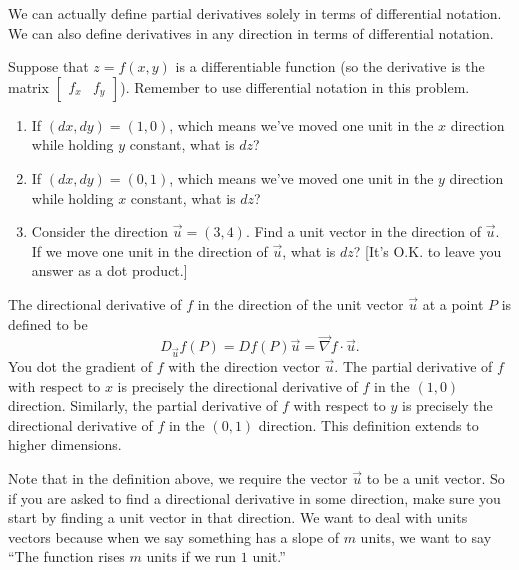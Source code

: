 We can actually define partial derivatives solely in terms of differential notation. We can also define derivatives in any direction in terms of differential notation.

\begin{problem}
Suppose that $z=f(x,y)$ is a differentiable function (so the derivative is the matrix $\begin{bmatrix}f_x&f_y\end{bmatrix}$).  Remember to use differential notation in this problem.
\begin{enumerate}
 \item If $(dx,dy)=(1,0)$, which means we've moved one unit in the $x$ direction while holding $y$ constant, what is $dz$?
 \item If $(dx,dy)=(0,1)$, which means we've moved one unit in the $y$ direction while holding $x$ constant, what is $dz$?
 \item Consider the direction $\vec u=(3,4)$.  Find a unit vector in the direction of $\vec u$.  If we move one unit in the direction of $\vec u$, what is $dz$? [It's O.K. to leave you answer as a dot product.]    
\end{enumerate}
 
\end{problem}

\begin{definition}
The directional derivative of $f$ in the direction of the unit vector $\vec u$ at a point $P$ is defined to be
$$D_{\vec u} f(P) = Df(P) \vec u = \vec \nabla f \cdot \vec u.$$
You dot the gradient of $f$ with the direction vector $\vec u$.
The partial derivative of $f$ with respect to $x$ is precisely the directional derivative of $f$ in the $(1,0)$ direction.  Similarly,  
the partial derivative of $f$ with respect to $y$ is precisely the directional derivative of $f$ in the $(0,1)$ direction. 
This definition extends to higher dimensions.
\end{definition}

Note that in the definition above, we require the vector $\vec u$ to be a unit vector.  So if you are asked to find a directional derivative in some direction, make sure you start by finding a unit vector in that direction. We want to deal with units vectors because when we say something has a slope of $m$ units, we want to say ``The function rises $m$ units if we run $1$ unit.''  

